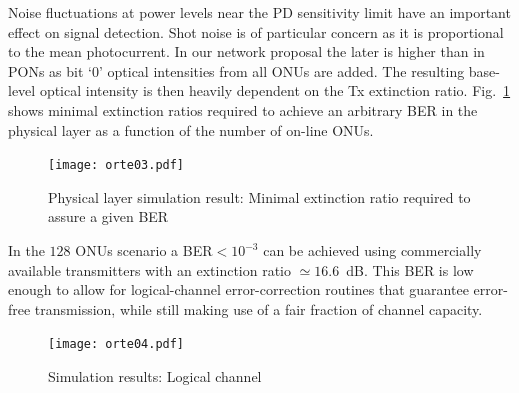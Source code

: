 \documentclass[a4paper,10pt]{report}
\begin{document}
Noise fluctuations at power levels near the PD sensitivity limit have an important effect on signal detection. 
Shot noise is of particular concern as it is proportional to the mean photocurrent.
In our network proposal the later is higher than in PONs as bit
`0' optical intensities from all ONUs are added.
The resulting base-level optical intensity is then heavily dependent on the Tx extinction ratio.
Fig.~\ref{sim:optical} shows minimal extinction ratios required to
achieve an arbitrary BER in the physical layer as a function of the
number of on-line ONUs.
\begin{figure}[!t]
    \centering
      \texttt{[image: orte03.pdf]}
      \caption{Physical layer simulation result: Minimal extinction ratio required to assure a given BER}
      \label{sim:optical}
\end{figure}
In the $128$ ONUs scenario a  BER$<10^{-3}$ can be achieved using
commercially available transmitters with an extinction ratio $\simeq16.6$~dB.
This BER is low enough to allow for logical-channel error-correction routines that guarantee error-free transmission, while still making use of a fair fraction of channel capacity.
\begin{figure}[!t]
    \centering
      \texttt{[image: orte04.pdf]}
    \caption{Simulation results: Logical channel}
      \label{sim:access}
\end{figure}
\end{document}
